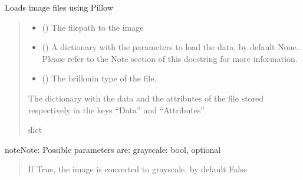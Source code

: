 \documentclass[letterpaper,10pt,english]{sphinxmanual}
\begin{document}

\begin{fulllineitems}
\label{\detokenize{source/HDF5_BLS:HDF5_BLS.load_data.load_image_file}}
\pysigstartsignatures
\pysiglinewithargsret
{}
{\sphinxparamcomma {}\sphinxparamcomma {}}
{}
\pysigstopsignatures
\sphinxAtStartPar
Loads image files using Pillow
\begin{quote}\begin{description}
\begin{itemize}
\item {} 
\sphinxAtStartPar
{} () \textendash{} The filepath to the image

\item {} 
\sphinxAtStartPar
{} (\sphinxstyleliteralemphasis{\sphinxupquote{, }}) \textendash{} A dictionary with the parameters to load the data, by default None. Please refer to the Note section of this docstring for more information.

\item {} 
\sphinxAtStartPar
{} (\sphinxstyleliteralemphasis{\sphinxupquote{, }}) \textendash{} The brillouin type of the file.

\end{itemize}

\sphinxAtStartPar
The dictionary with the data and the attributes of the file stored respectively in the keys “Data” and “Attributes”

\sphinxAtStartPar
dict

\end{description}\end{quote}

\begin{sphinxadmonition}{note}{Note:}
\sphinxAtStartPar
Possible parameters are:
\sphinxhyphen{} grayscale: bool, optional
\begin{quote}

\sphinxAtStartPar
If True, the image is converted to grayscale, by default False
\end{quote}
\end{sphinxadmonition}

\end{fulllineitems}
\end{document}
